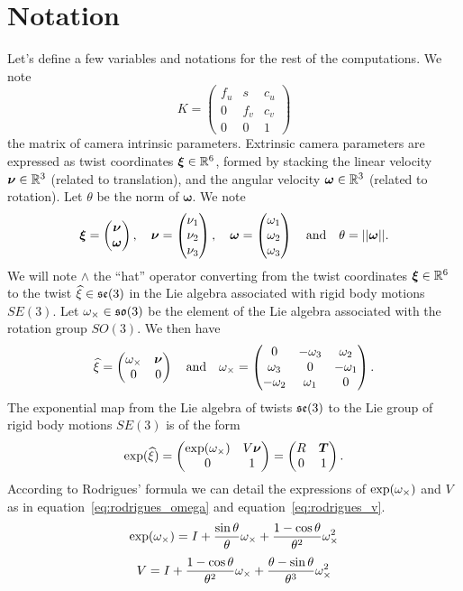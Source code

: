 \section{Notation}%
\label{sec:notation}

Let's define a few variables and notations for the rest of the computations.
We note
\[
	K = \begin{pmatrix}
		f_u & s & c_u \\
		0 & f_v & c_v \\
		0 & 0 & 1
	\end{pmatrix}
\]
the matrix of camera intrinsic parameters.
Extrinsic camera parameters are expressed as twist coordinates $\bm{\xi} \in \R^6$,
formed by stacking the linear velocity $\bm{\nu} \in \R^3$ (related to translation),
and the angular velocity $\bm{\omega} \in \R^3$ (related to rotation).
Let $\theta$ be the norm of $\bm{\omega}$. We note
\[
	\bm{\xi} = \vecxy{\bm{\nu}}{\bm{\omega}}
	,\quad
	\bm{\nu} = \vecxyz{\nu_1}{\nu_2}{\nu_3}
	,\quad
	\bm{\omega} = \vecxyz{\omega_1}{\omega_2}{\omega_3}
	\quad \textrm{and} \quad
	\theta = ||\bm{\omega}||.
\]
We will note $\wedge$ the ``hat'' operator converting
from the twist coordinates $\bm{\xi} \in \R^6$ to the twist
$\twist{\xi} \in \seee$ in the Lie algebra associated with rigid body motions $SE(3)$.
Let $\cross{\omega} \in \sooo$
be the element of the Lie algebra associated with the rotation group $SO(3)$.
We then have
\[
	\twist{\xi} = \begin{pmatrix}
		\cross{\omega} & \bm{\nu} \\
		0 & 0
	\end{pmatrix}
	\quad \textrm{and} \quad
	\cross{\omega} = \hatmat{\omega_1}{\omega_2}{\omega_3}.
\]
The exponential map from the Lie algebra of twists $\seee$
to the Lie group of rigid body motions $SE(3)$ is of the form
\[
	\exp(\twist{\xi})
	= \begin{pmatrix}
		\exp(\cross{\omega}) & V \bm{\nu} \\
		0 & 1
	\end{pmatrix}
	= \begin{pmatrix}
		R & \bm{T} \\
		0 & 1
	\end{pmatrix}.
\]
According to Rodrigues' formula we can detail the expressions of $\exp(\cross{\omega})$ and $V$
as in equation~\ref{eq:rodrigues_omega} and equation~\ref{eq:rodrigues_v}.
\begin{equation}
\label{eq:rodrigues_omega}
	\exp(\cross{\omega}) =
		I
		+ \frac{\sin\theta}{\theta} \cross{\omega}
		+ \frac{1-\cos\theta}{\theta^2} \cross{\omega}^2
\end{equation}
\begin{equation}
	\label{eq:rodrigues_v}
	V =
		I
		+ \frac{1-\cos\theta}{\theta^2} \cross{\omega}
		+ \frac{\theta - \sin\theta}{\theta^3} \cross{\omega}^2
\end{equation}

